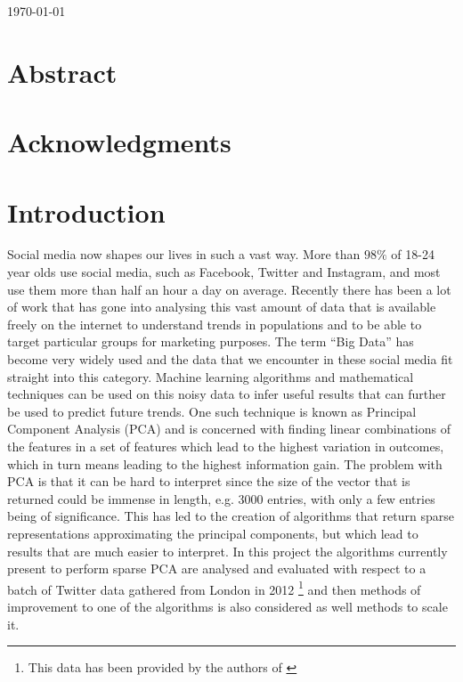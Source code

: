 \documentclass[11pt,a4paper]{article}
\begin{document}
\begin{titlepage}

{\large \today}\\[3cm] %

\vfill %

\end{titlepage}





\newpage




\section*{\center Abstract}
\clearpage
\section*{\center Acknowledgments}
\clearpage
\tableofcontents
\newpage
{}

\section{Introduction}
Social media now shapes our lives in such a vast way. More than $98\%$ of 18-24 year olds use social media, such as Facebook, Twitter and Instagram, and most use them more than half an hour a day on average\cite{statbrain}. Recently there has been a lot of work that has gone into analysing this vast amount of data that is available freely on the internet to understand trends in populations and to be able to target particular groups for marketing purposes. The term ``Big Data'' has become very widely used and the data that we encounter in these social media fit straight into this category. Machine learning algorithms and mathematical techniques can be used on this noisy data to infer useful results that can further be used to predict future trends. 
One such technique is known as Principal Component Analysis (PCA) and is concerned with finding linear combinations of the features in a set of features which lead to the highest variation in outcomes, which in turn means leading to the highest information gain. The problem with PCA is that it can be hard to interpret since the size of the vector that is returned could be immense in length, e.g. 3000 entries, with only a few entries being of significance. This has led to the creation of algorithms that return sparse representations approximating the principal components, but which lead to results that are much easier to interpret. In this project the algorithms currently present to perform sparse PCA are analysed and evaluated with respect to a batch of Twitter data gathered from London in 2012 \footnote{This data has been provided by the authors of \cite{microblogs}} and then methods of improvement to one of the algorithms is also considered as well methods to scale it. 
\end{document}

